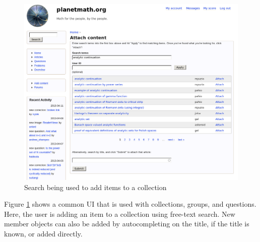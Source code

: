 \begin{vplace}[0.7]
\begin{figure}[h]
\begin{center}
\includegraphics[width=.85\textwidth]{./inputs/AttachableContent.png}
\end{center}
\caption{Search being used to add items to a collection \label{AttachableContent}}
\end{figure}
\bigskip

Figure \ref{AttachableContent} shows a common UI that is used with
collections, groups, and questions.  Here, the user is adding an item
to a collection using free-text search.  New member objects can also
be added by autocompleting on the title, if the title is known, or
added directly.
\end{vplace}

\newpage
\FloatBarrier

